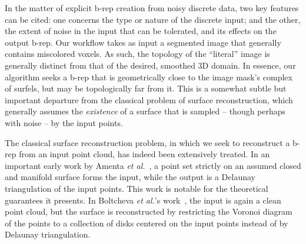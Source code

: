 In the matter of explicit b-rep creation from noisy discrete data, two key features can be cited:  one concerns the type or nature of the discrete input; and the other, the extent of noise in the input that can be tolerated, and its effects on the output b-rep.  Our workflow takes as input a segmented image that generally contains miscolored voxels.  As such, the topology of the ``literal'' image is generally distinct from that of the desired, smoothed 3D domain.  In essence, our algorithm seeks a b-rep that is geometrically close to the image mask's complex of surfels, but may be topologically far from it.  This is a somewhat subtle but important departure from the classical problem of surface reconstruction, which generally assumes the {\em existence} of a surface that is sampled -- though perhaps with noise -- by the input points.

The classical surface reconstruction problem, in which we seek to reconstruct a b-rep from an input point cloud, has indeed been extensively treated.  In an important early work by Amenta \textit{et al.}~\cite{amenta2000}, a point set strictly on an assumed closed and manifold surface forms the input, while the output is a Delaunay triangulation of the input points.  This work is notable for the theoretical guarantees it presents.  In Boltcheva \textit{et al.}'s work~\cite{boltcheva2017}, the input is again a clean point cloud, but the surface is reconstructed by restricting the Voronoi diagram of the points to a collection of disks centered on the input points instead of by Delaunay triangulation.

